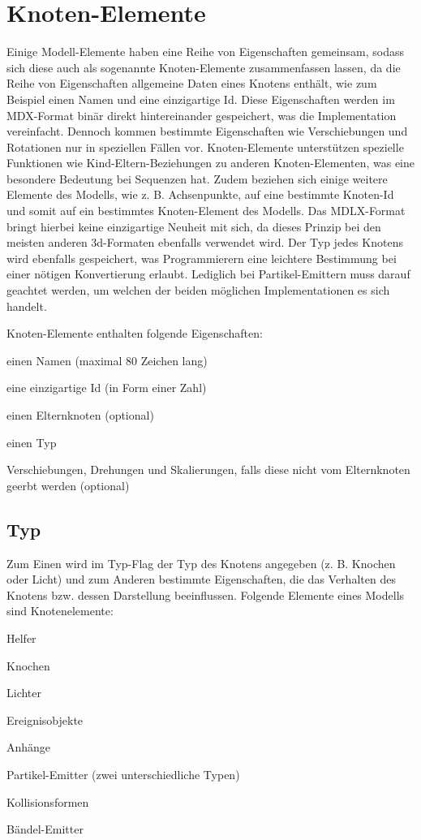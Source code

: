 \section{Knoten-Elemente}
Einige Modell-Elemente haben eine Reihe von Eigenschaften gemeinsam, sodass sich diese auch als sogenannte Knoten-Elemente zusammenfassen lassen, da die Reihe von Eigenschaften allgemeine Daten eines Knotens enthält, wie zum Beispiel einen Namen und eine einzigartige Id. Diese Eigenschaften werden im MDX-Format binär direkt hintereinander gespeichert, was die Implementation vereinfacht.
Dennoch kommen bestimmte Eigenschaften wie Verschiebungen und Rotationen nur in speziellen Fällen vor.
Knoten-Elemente unterstützen spezielle Funktionen wie Kind-Eltern-Beziehungen zu anderen Knoten-Elementen, was eine besondere Bedeutung bei Sequenzen hat.
Zudem beziehen sich einige weitere Elemente des Modells, wie z. B. Achsenpunkte, auf eine bestimmte Knoten-Id und somit auf ein bestimmtes Knoten-Element des Modells.
Das MDLX-Format bringt hierbei keine einzigartige Neuheit mit sich, da dieses Prinzip bei den meisten
anderen 3d-Formaten ebenfalls verwendet wird.
Der Typ jedes Knotens wird ebenfalls gespeichert, was Programmierern eine leichtere Bestimmung bei einer
nötigen Konvertierung erlaubt.
Lediglich bei Partikel-Emittern muss darauf geachtet werden, um welchen der beiden möglichen Implementationen
es sich handelt.

Knoten-Elemente enthalten folgende Eigenschaften:
\item einen Namen (maximal 80 Zeichen lang)
\item eine einzigartige Id (in Form einer Zahl)
\item einen Elternknoten (optional)
\item einen Typ
\item Verschiebungen, Drehungen und Skalierungen, falls diese nicht vom Elternknoten geerbt werden (optional)

\subsection{Typ}
Zum Einen wird im Typ-Flag der Typ des Knotens angegeben (z. B. Knochen oder Licht) und zum Anderen bestimmte Eigenschaften,
die das Verhalten des Knotens bzw. dessen Darstellung beeinflussen.
Folgende Elemente eines Modells sind Knotenelemente:
\item Helfer
\item Knochen
\item Lichter
\item Ereignisobjekte
\item Anhänge
\item Partikel-Emitter (zwei unterschiedliche Typen)
\item Kollisionsformen
\item Bändel-Emitter

